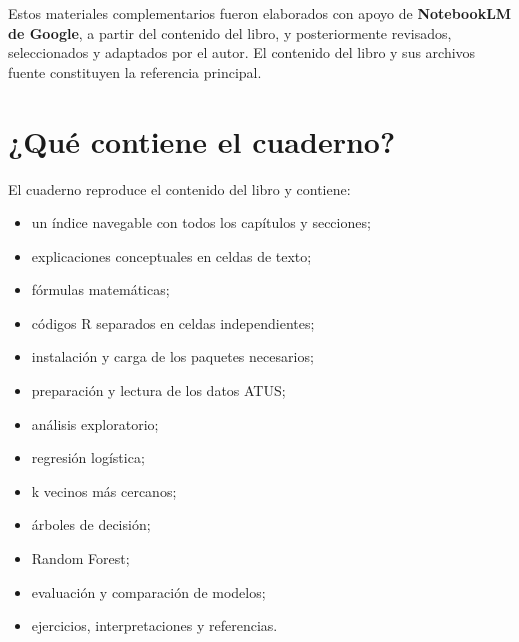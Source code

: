 \documentclass[
  spanish,
  10.5pt,
  letterpaper,
  openany,
  headings=big]{scrbook}
\providecommand{\tightlist}{%
  \setlength{\itemsep}{0pt}\setlength{\parskip}{0pt}}
\begin{document}
\begin{tcolorbox}[enhanced jigsaw, arc=.35mm, bottomrule=.15mm, bottomtitle=1mm, breakable, colback=white, colbacktitle=quarto-callout-note-color!10!white, colframe=quarto-callout-note-color-frame, coltitle=black, left=2mm, leftrule=.75mm, opacityback=0, opacitybacktitle=0.6, rightrule=.15mm, title=\textcolor{quarto-callout-note-color}{\faInfo}\hspace{0.5em}{Elaboración de los recursos}, titlerule=0mm, toprule=.15mm, toptitle=1mm]

Estos materiales complementarios fueron elaborados con apoyo de
\textbf{NotebookLM de Google}, a partir del contenido del libro, y
posteriormente revisados, seleccionados y adaptados por el autor. El
contenido del libro y sus archivos fuente constituyen la referencia
principal.

\end{tcolorbox}

\section*{¿Qué contiene el cuaderno?}\label{quuxe9-contiene-el-cuaderno}


El cuaderno reproduce el contenido del libro y contiene:

\begin{itemize}
\tightlist
\item
  un índice navegable con todos los capítulos y secciones;
\item
  explicaciones conceptuales en celdas de texto;
\item
  fórmulas matemáticas;
\item
  códigos R separados en celdas independientes;
\item
  instalación y carga de los paquetes necesarios;
\item
  preparación y lectura de los datos ATUS;
\item
  análisis exploratorio;
\item
  regresión logística;
\item
  k vecinos más cercanos;
\item
  árboles de decisión;
\item
  Random Forest;
\item
  evaluación y comparación de modelos;
\item
  ejercicios, interpretaciones y referencias.
\end{itemize}
\end{document}
